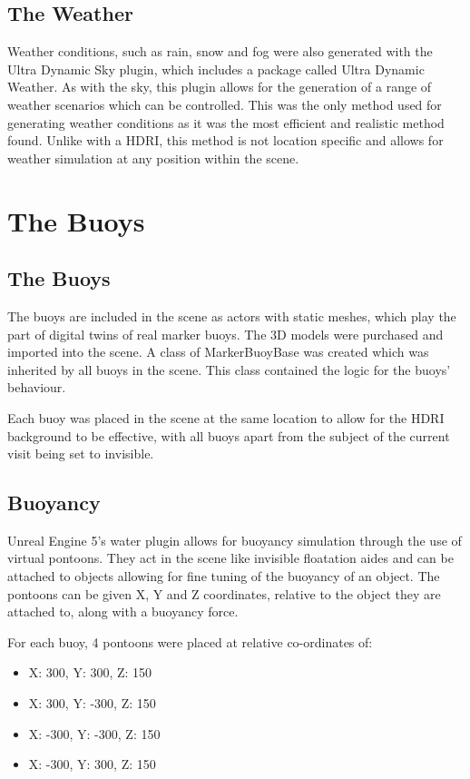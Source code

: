 \documentclass[10pt,twocolumn,letterpaper]{article}
\begin{document}
\subsection{The Weather}

Weather conditions, such as rain, snow and fog were also generated with the Ultra Dynamic Sky plugin, which includes a package called Ultra Dynamic Weather. As with the sky, this plugin allows for the generation of a range of weather scenarios which can be controlled. This was the only method used for generating weather conditions as it was the most efficient and realistic method found. Unlike with a HDRI, this method is not location specific and allows for weather simulation at any position within the scene.

\section{The Buoys}

\subsection{The Buoys} \label{sec:the_buoys}

The buoys are included in the scene as actors with static meshes, which play the part of digital twins of real marker buoys. The 3D models were purchased and imported into the scene. A class of MarkerBuoyBase was created which was inherited by all buoys in the scene. This class contained the logic for the buoys' behaviour.

Each buoy was placed in the scene at the same location to allow for the HDRI background to be effective, with all buoys apart from the subject of the current visit being set to invisible.

\subsection{Buoyancy}

Unreal Engine 5's water plugin allows for buoyancy simulation through the use of virtual pontoons. They act in the scene like invisible floatation aides and can be attached to objects allowing for fine tuning of the buoyancy of an object. The pontoons can be given X, Y and Z coordinates, relative to the object they are attached to, along with a buoyancy force.

For each buoy, 4 pontoons were placed at relative co-ordinates of:

\begin{itemize}
    \item X: 300, Y: 300, Z: 150
    \item X: 300, Y: -300, Z: 150
    \item X: -300, Y: -300, Z: 150
    \item X: -300, Y: 300, Z: 150
\end{itemize}
\end{document}
